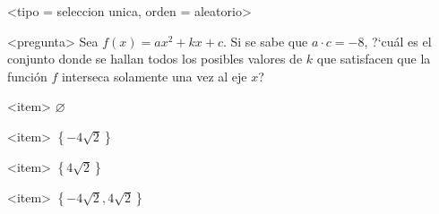 <tipo = seleccion unica, orden = aleatorio>

<pregunta>
Sea $f(x)=ax^2+kx+c$. Si se sabe que $a\cdot c=-8$, ?`cu\'al es el conjunto donde se hallan todos los posibles valores de $k$ que satisfacen que la funci\'on $f$ interseca solamente una vez al eje $x$?


<item>
$\varnothing$

<item>
$\left\{-4\sqrt{2}\right\}$

<item>
$\left\{4\sqrt{2}\right\}$

<item>
$\left\{-4\sqrt{2},4\sqrt{2}\right\}$



